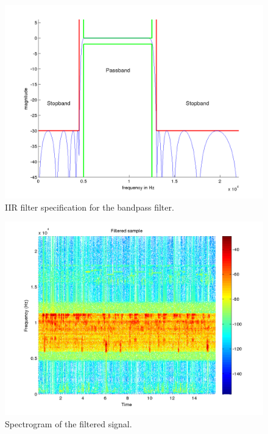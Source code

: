 \begin{figure}
  \begin{center}
    \hspace*{-1in}
    \includegraphics[width=180mm]{q1_iir_filter_specification}
    \caption{IIR filter specification for the
      bandpass filter. \label{fig:q1_iir_filter_specification}}
  \end{center}  
\end{figure}

\begin{figure}
  \begin{center}
    \hspace*{-1in}
    \includegraphics[width=180mm]{q1_filtered_spectrogram}
    \caption{Spectrogram of the filtered signal. 
      \label{fig:q1_filtered_spectrogram}}
  \end{center}  
\end{figure}

